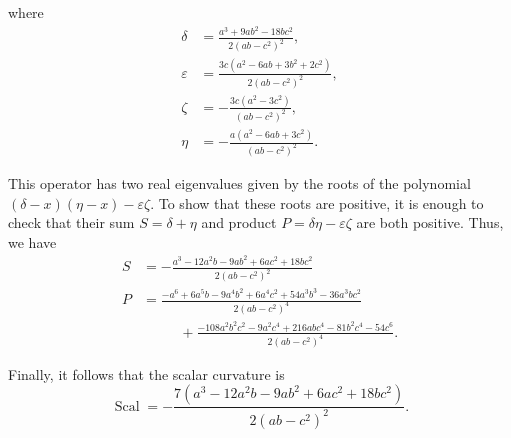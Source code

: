 \documentclass{amsart}
\let\epsilon\varepsilon
\numberwithin{equation}{section}
\theoremstyle{plain}
\theoremstyle{definition}
\theoremstyle{remark}
\numberwithin{table}{section}
\DeclareMathOperator{\Scal}{Scal}
\begin{document}
        where
        \begin{equation}\label{eq:Ric11abc}
        \begin{aligned}
            \delta &= \frac{a^3 + 9 a b^2 - 18 b c^2}{2 (a b - c^2)^2}, \\
            \epsilon &= \frac{3c (a^2 - 6 a b + 3 b^2 + 2 c^2)}{2 (a b - c^2)^2}, \\
            \zeta &= -\frac{3c (a^2 - 3 c^2)}{(a b - c^2)^2},\\
            \eta &= -\frac{a (a^2 - 6 a b + 3 c^2)}{(a b - c^2)^2}.
        \end{aligned}
        \end{equation}
        
        This operator has two real eigenvalues given by the roots of the polynomial $(\delta-x)(\eta-x)-\epsilon\zeta$.
        To show that these roots are positive, it is enough to check that their sum $S=\delta+\eta$ and product $P=\delta\eta-\epsilon\zeta$ are both positive.
        Thus, we have
        \begin{align*}
            S &= -\frac{a^3 - 12 a^2 b - 9 a b^2 + 6 a c^2 + 18 b c^2}{2 (a b - c^2)^2}\\
            P &= \frac{-a^6 + 6 a^5 b - 9 a^4 b^2 + 6 a^4 c^2 + 54 a^3 b^3 - 36 a^3 b c^2 }{2 (a b - c^2)^4} \\
            &\phantom{==} + \frac{- 108 a^2 b^2 c^2 - 9 a^2 c^4 + 216 a b c^4 - 81 b^2 c^4 - 54 c^6}{2 (a b - c^2)^4}.
        \end{align*}
        
        Finally, it follows that the scalar curvature is
        \[
            \Scal = -\frac{7(a^3 - 12 a^2 b - 9 a b^2 + 6 a c^2 + 18 b c^2)}{2 (a b - c^2)^2}.
        \]

    
\end{document}
